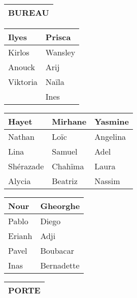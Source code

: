 \documentclass[a4paper, 20pt]{extarticle}
\begin{document}

\begin{center}
	\begin{tabular}{|P{.4\textwidth}|}\hline
		BUREAU \\ \hline
	\end{tabular}
\end{center}
\vfill
\begin{center}
	\begin{tabular}{|P{.1\textwidth}|P{.1\textwidth}|}\hline
	Ilyes & Prisca  \\ \hline
	Kirlos & Wansley \\ \hline
	Anouck & Arij \\ \hline
	Viktoria & Naïla \\ \hline
	 & Ines \\ \hline
	\end{tabular}
	\hfill
	\begin{tabular}{|P{.12\textwidth}|P{.11\textwidth}|P{.11\textwidth}|}\hline
	Hayet & Mirhane & Yasmine \\ \hline
	Nathan & Loïc & Angelina\\ \hline
	Lina & Samuel & Adel\\ \hline
	Shérazade & Chahïma & Laura \\ \hline
	Alycia & Beatriz & Nassim \\ \hline
	\end{tabular}
	\hfill
	\begin{tabular}{|P{.1\textwidth}|P{.13\textwidth}|}\hline
	Nour & Gheorghe \\ \hline
	Pablo & Diego \\ \hline
	Erianh & Adji \\ \hline
	Pavel & Boubacar \\ \hline
	Inas & Bernadette \\ \hline
	\end{tabular}
\end{center}

\hfill
\begin{tabular}{|P{.1\textwidth}|}\hline
	PORTE \\ \hline
\end{tabular}
\end{document}
